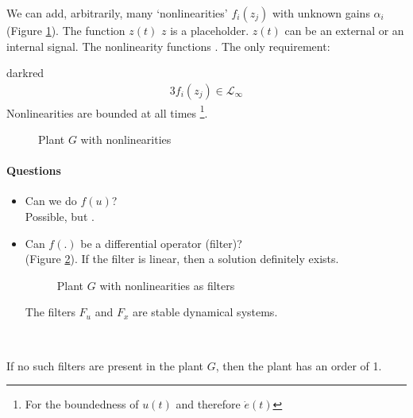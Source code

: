 

We can add, arbitrarily, many `nonlinearities' $f_i(z_j)$ with
unknown gains $\alpha_i$ (Figure \ref{fig:nonlinearities}).
The function $z(t)$ $z$ is a placeholder. $z(t)$
can be an external or an internal signal.
The nonlinearity functions
.
The only requirement:\\

\begin{conclusion}{darkred}
    \begin{alignat*}{3}
        f_i(z_j) \in \mathcal{L}_\infty
    \end{alignat*}
    Nonlinearities are bounded at all times%
    \footnote{For the boundedness of $u(t)$ and therefore $\dot{e}(t)$}.
\end{conclusion}

\begin{figure}[H]
    \centering
    
    \caption{Plant $G$ with nonlinearities}
    \label{fig:nonlinearities}
\end{figure}

\paragraph{Questions}
\begin{itemize}
\item Can we do $f(u)$?\\
    Possible, but .
\item Can $f(.)$ be a differential operator (filter)?\\
     (Figure \ref{fig:nonlin-filter}).
    If the filter is linear, then a solution
    definitely exists.
    \begin{figure}[H]
        \centering
        
        \caption{Plant $G$ with nonlinearities as filters}
        \label{fig:nonlin-filter}
    \end{figure}
    The filters $F_u$ and  $F_x$ are stable dynamical systems.
\end{itemize}~

If no such filters are present in the plant $G$,
then the plant has an order of 1.\\

